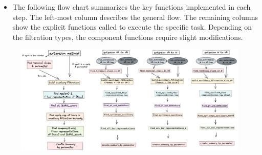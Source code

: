 \documentclass{article}
\begin{document}
\begin{itemize}
\item The following flow chart summarizes the key functions implemented in each step. The left-most column describes the general flow. The remaining columns show the explicit functions called to execute the specific task. Depending on the filtration types, the component functions require slight modifications.
\end{itemize}

\begin{figure}[h!]
\centering
\includegraphics[width = \textwidth]{code_components.png}
\end{figure}
\end{document}
